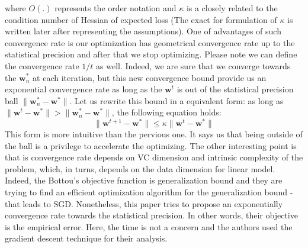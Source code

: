 \documentclass[11pt, a4paper, reqno, twoside]{scrartcl}
\theoremstyle{style}
\newcommand{\wv}{\bm{w}}
\newcommand{\0}{\mathbf{0}} %
\begin{document}
where $O(.)$ represents the order notation and $\kappa$ is a closely related to
the condition number of Hessian of expected loss (The exact for formulation of
$\kappa$ is written later after representing the assumptions). One of
advantages of such convergence rate is our optimization has geometrical convergence rate up to the statistical precision
 and after that we stop optimizing. Please note we can define the convergence
 rate $1/t$ as well. Indeed, we are sure that we converge towards the $\wv_n^*$
 at each iteration, but this new convergence bound provide us an exponential
 convergence rate as long as the $\wv^{t}$ is out of the statistical precision
 ball $\| \wv_n^* - \wv^* \|$. Let us rewrite this bound in a equivalent form:
 as long as $\|\wv^{t} - \wv^*\| > \| \wv_n^* - \wv^* \| $, the following
 equation holds: 
 \begin{equation}
 	\|\wv^{t+1} - \wv^*\|  \leq \kappa \|\wv^{t} - \wv^*\|
 \end{equation}
 This form is more intuitive than the pervious one. It says us that being
 outside of the ball is a privilege to accelerate the optimizing. The other
 interesting point is that is convergence rate depends on VC dimension and intrinsic complexity of the problem, which, in turns, depends on the data dimension for linear model. Indeed, the Bottou's objective function is generalization bound and they are trying to find an efficient optimization algorithm for the generalization bound -that leads to SGD. Nonetheless, this paper tries to propose an exponentially convergence rate towards the statistical precision. In other words, their objective is the empirical error. Here, the
time is not a concern and the authors used the gradient descent technique
for their analysis.
\end{document}
